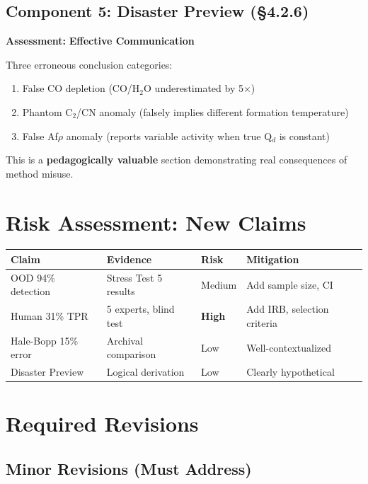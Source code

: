 \documentclass[12pt,a4paper]{article}
\newcommand{\critical}[1]{\textcolor{CriticalRed}{\textbf{#1}}}
\newcommand{\good}[1]{\textcolor{GoodGreen}{\textbf{#1}}}
\begin{document}
\subsection{Component 5: Disaster Preview (\S4.2.6)}

\textbf{Assessment:} \good{Effective Communication}

Three erroneous conclusion categories:
\begin{enumerate}
\item False CO depletion (CO/H$_2$O underestimated by 5$\times$)
\item Phantom C$_2$/CN anomaly (falsely implies different formation temperature)
\item False Af$\rho$ anomaly (reports variable activity when true Q$_d$ is constant)
\end{enumerate}

This is a \good{pedagogically valuable} section demonstrating real consequences of method misuse.

\section{Risk Assessment: New Claims}

\begin{center}
\begin{tabular}{|l|l|l|l|}
\hline
\textbf{Claim} & \textbf{Evidence} & \textbf{Risk} & \textbf{Mitigation} \\
\hline
OOD 94\% detection & Stress Test 5 results & Medium & Add sample size, CI \\
Human 31\% TPR & 5 experts, blind test & \critical{High} & Add IRB, selection criteria \\
Hale-Bopp 15\% error & Archival comparison & Low & Well-contextualized \\
Disaster Preview & Logical derivation & Low & Clearly hypothetical \\
\hline
\end{tabular}
\end{center}

\section{Required Revisions}

\subsection{Minor Revisions (Must Address)}
\end{document}
